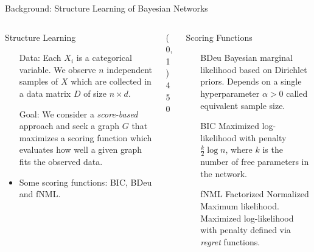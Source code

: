 \documentclass[final]{beamer}
\newcommand{\heading}[1]{\alert{\large #1}\\}
\theoremstyle{plain}
\begin{document}
\begin{frame}{}
\begin{block}{Background: Structure Learning of Bayesian Networks}
\begin{columns}[T]
   \begin{column}{0.3\textwidth} %
     \heading{Structure Learning}
     \vspace*{12pt}
     \begin{itemize}
     \setlength\itemsep{1em}
     \item[Data:] Each $X_i$ is a categorical variable. We observe $n$ independent samples of $X$ which are collected in a data matrix $D$ of size $n\times d$. 
     \item[Goal:] We consider a \textit{score-based} approach and seek a graph $G$ that maximizes a scoring function which evaluates how well a given graph fits the observed data.
     \item Some scoring functions: BIC, BDeu and fNML. 
   	 \end{itemize}
   \end{column}
  
   \begin{column}{0.005\textwidth}\linethickness{0.3ex} %
      \color{myPurple} \line(0,1){450}
   \end{column} %
   \begin{column}{0.3\textwidth}%
     \heading{Scoring Functions}
     \begin{itemize}
	 \vspace*{12pt}
	 \setlength\itemsep{1em}     
     \item[BDeu] Bayesian marginal likelihood based on Dirichlet priors. Depends on a single 
     hyperparameter $\alpha >0$ called equivalent sample size. 
     \item[BIC] Maximized log-likelihood with penalty $\frac{k}{2}\log n$, where $k$ is the number of free parameters in the network. 
     \item[fNML] Factorized Normalized Maximum likelihood. Maximized log-likelihood with penalty defined via \textit{regret} functions.
     \end{itemize}
     
   \end{column} %
\end{columns}
\end{block}



\end{frame}
\end{document}
